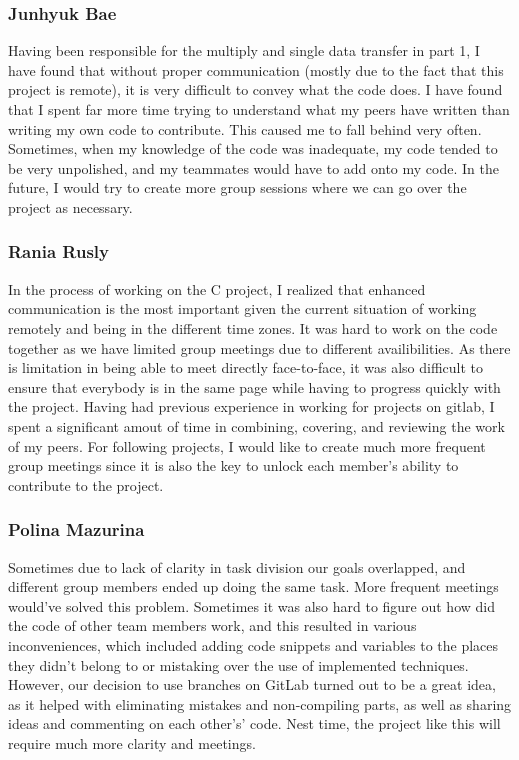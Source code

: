 \documentclass[11pt]{article}
\begin{document}
\subsubsection{Junhyuk Bae}
Having been responsible for the multiply and single data transfer in part 1, I have found that without proper communication (mostly due to the fact that this project is remote), it is very difficult to convey what the code does. I have found that I spent far more time trying to understand what my peers have written than writing my own code to contribute. This caused me to fall behind very often. Sometimes, when my knowledge of the code was inadequate, my code tended to be very unpolished, and my teammates would have to add onto my code. In the future, I would try to create more group sessions where we can go over the project as necessary.
\subsubsection{Rania Rusly}
In the process of working on the C project, I realized that enhanced communication is the most important given the current situation of working remotely and being in the different time zones. It was hard to work on the code together as we have limited group meetings due to different availibilities. As there is limitation in being able to meet directly face-to-face, it was also difficult to ensure that everybody is in the same page while having to progress quickly with the project. Having had previous experience in working for projects on gitlab, I spent a significant amout of time in combining, covering, and reviewing the work of my peers. For following projects, I would like to create much more frequent group meetings since it is also the key to unlock each member’s ability to contribute to the project.
\subsubsection{Polina Mazurina}
Sometimes due to lack of clarity in task division our goals overlapped, and different group members ended up doing the same task. More frequent meetings would’ve solved this problem.  Sometimes it was also hard to figure out how did the code of other team members work, and this resulted in various inconveniences, which included adding code snippets and variables to the places they didn’t belong to or mistaking over the use of implemented techniques. However, our decision to use branches on GitLab turned out to be a great idea, as it helped with eliminating mistakes and non-compiling parts, as well as sharing ideas and commenting on each other’s’ code. Nest time, the project like this will require much more clarity and meetings. 
\newpage
\end{document}
